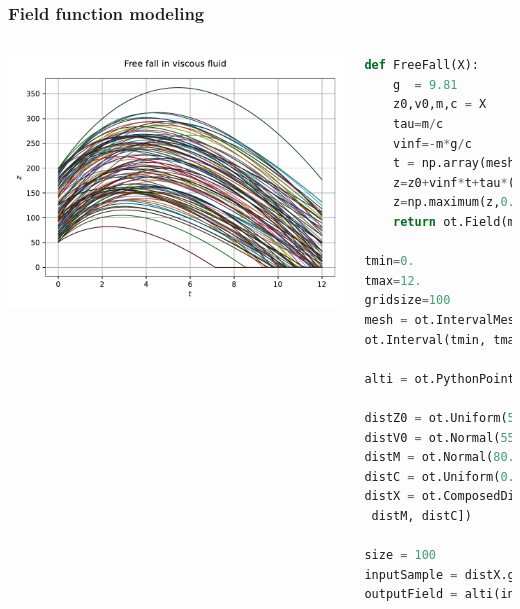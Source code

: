 \documentclass[aspectratio=169]{beamer}
\begin{document}
\begin{frame}[containsverbatim]
\frametitle{Field function modeling}

\scriptsize 
\begin{columns}

    \includegraphics[width=1.\textwidth]{figures/Trajectories.pdf}
    
        
\tiny
\begin{lstlisting}[language=Python, numbers = none]
def FreeFall(X):
    g  = 9.81
    z0,v0,m,c = X
    tau=m/c
    vinf=-m*g/c
    t = np.array(mesh.getVertices().asPoint())
    z=z0+vinf*t+tau*(v0-vinf)*(1-np.exp(-t/tau))
    z=np.maximum(z,0.0)
    return ot.Field(mesh, [[zeta] for zeta in z])

tmin=0. 
tmax=12.
gridsize=100 
mesh = ot.IntervalMesher([gridsize-1]).build(
ot.Interval(tmin, tmax))

alti = ot.PythonPointToFieldFunction(4, mesh,  1, AltiFunc)

distZ0 = ot.Uniform(50.0, 200.0)
distV0 = ot.Normal(55.0, 10.0)
distM = ot.Normal(80.0, 8.0)
distC = ot.Uniform(0.0, 30.0)
distX = ot.ComposedDistribution([distZ0, distV0,
 distM, distC])

size = 100
inputSample = distX.getSample(size)
outputField = alti(inputSample)
\end{lstlisting}

\end{columns}
\end{frame}


\end{document}
